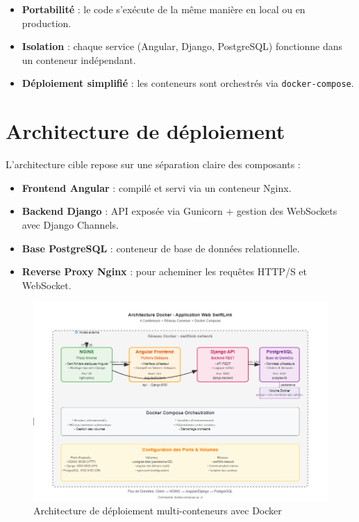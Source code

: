 \begin{itemize}
  \item \textbf{Portabilité} : le code s’exécute de la même manière en local ou en production.
  \item \textbf{Isolation} : chaque service (Angular, Django, PostgreSQL) fonctionne dans un conteneur indépendant.
  \item \textbf{Déploiement simplifié} : les conteneurs sont orchestrés via \texttt{docker-compose}.
\end{itemize}

\section{Architecture de déploiement}

\noindent L’architecture cible repose sur une séparation claire des composants :
\begin{itemize}
  \item \textbf{Frontend Angular} : compilé et servi via un conteneur Nginx.
  \item \textbf{Backend Django} : API exposée via Gunicorn + gestion des WebSockets avec Django Channels.
  \item \textbf{Base PostgreSQL} : conteneur de base de données relationnelle.
  \item \textbf{Reverse Proxy Nginx} : pour acheminer les requêtes HTTP/S et WebSocket.
\end{itemize}

\begin{figure}[H]
\centering
\includegraphics[width=0.9\linewidth]{figures/architecture docker.png}
\caption{Architecture de déploiement multi-conteneurs avec Docker}
\end{figure}

